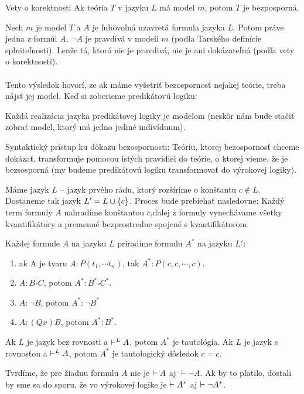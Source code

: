 \begin{dosledok}{Vety o korektnosti}
    Ak teória $T$ v jazyku $L$ má model $m$, potom $T$ je
    bezposporná.
\end{dosledok}
\begin{dokaz}
    Nech $m$ je model $T$ a $A$ je ľubovoľná uzavretá formula jazyka $L$.
    Potom práve jedna z formúl $A$, $\neg A$ je pravdivá v modeli $m$
    (podľa Tarského definície splniteľnosti).
    Lenže tá, ktorá nie je pravdivá, nie je ani dokázateľná 
    (podľa vety o korektnosti).
\end{dokaz}

\paragraph{}
\par Tento výsledok hovorí, ze ak máme vyšetriť bezospornosť nejakej teórie,
treba nájsť jej model. Keď si zoberieme predikátovú logiku:

\par Každá realizácia jazyka predikátovej logiky je modelom (neskôr nám bude
stačiť zobrať model, ktorý má jedno jediné indivíduum).

\par
Syntaktický prístup ku dôkazu bezospornosti: Teóriu, ktorej bezospornosť chceme
dokázať, transformuje pomocou istých pravidiel do teórie, o ktorej vieme, že je
bezsosporná  (my budeme predikátovú logiku transformovať do výrokovej logiky).

\begin{priklad}
    Máme jazyk $L$ -- jazyk prvého rádu, ktorý rozšírime o konštantu $c \notin L$.
    Dostaneme tak jazyk $L' = L \cup \{c\}$.
    Proces \fixme{} bude prebiehať nasledovne:
    Každý term formuly $A$ nahradíme konštantou $c$,ďalej  z formuly
    vynechávame všetky kvantifikátory a premenné bezprostredne spojené s
    kvantifikátorom.

    Každej formule $A$ na jazyku $L$ priradíme formulu $A^*$ na jazyku $L'$:
    \begin{enumerate}
            \item ak A je tvaru $A: P(t_1, \cdots t_n)$, tak $A^*: P(c, c, \cdots,c)$.
            \item $A: B \square C$, potom $A^*: B^* \square C^*$.
            \item $A: \neg B$, potom $A^*: \neg B^*$
            \item $A: (Qx) B$, potom $A^*: B^*$.
    \end{enumerate}

Ak $L$ je jazyk bez rovnosti a $\vdash^L A$, potom $A^*$ je tautológia. Ak $L$
je jazyk s rovnosťou a $\vdash^L A$, potom $A^*$ je tautologický dôsledok $c=c$.

\par Tvrdíme, že pre žiadnu formulu $A$ nie je $\vdash A$ aj $\vdash \neg A$. Ak
by to platilo, dostali by sme sa do sporu, že vo výrokovej logike je $\vdash
A^*$ aj $\vdash \neg A^*$.
\end{priklad}
